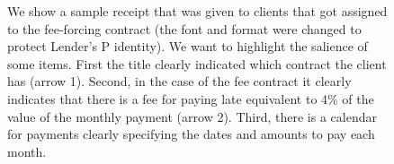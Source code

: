 \documentclass[oneside,11pt]{article}
\begin{document}
{\begin{figure}[H]
\begin{center}
    \end{center}
    \scriptsize
        We show a sample receipt that was given to clients that got assigned to the fee-forcing contract (the font and format were changed to protect Lender's P identity). We want to highlight the salience of some items. First the title clearly indicated which contract the client has (arrow 1). Second, in the case of the fee contract it clearly indicates that there is a fee for paying late equivalent to 4\% of the value of the monthly payment (arrow 2). Third, there is a calendar for payments clearly specifying the dates and amounts to pay each month. %
\end{figure}



}
\end{document}

